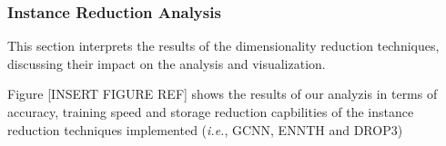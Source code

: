 \subsubsection{Instance Reduction Analysis}
\label{subsubsec:discussion-reduction}

This section interprets the results of the dimensionality reduction techniques, 
discussing their impact on the analysis and visualization.

Figure [INSERT FIGURE REF] shows the results of our analyzis in terms of accuracy, 
training speed and storage reduction capbilities of the instance reduction techniques
 implemented (\textit{i.e.}, GCNN, ENNTH and DROP3)
